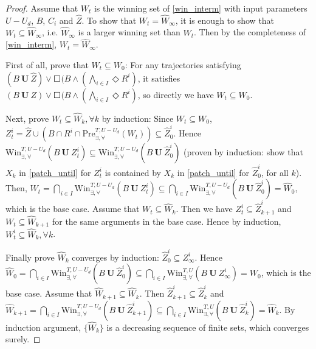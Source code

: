 \begin{proof}
	Assume that $ W_t $ is the winning set of \eqref{win_interm} with input parameters $ U-U_d $, $ B $, $ C_i $ and $ \widehat{Z} $. To show that $ W_t=\widehat{W}_\infty $, it is enough to show that $ W_t\subseteq \widehat{W}_\infty $, i.e. $ \widehat{W}_\infty $ is a larger winning set than $ W_t $. Then by the completeness of \eqref{win_interm}, $ W_t=\widehat{W}_\infty $. 
	
	First of all, prove that $ W_t \subseteq W_0 $: For any trajectories satisfying $ (B\mathbf{\ U\ }\widehat{Z})\vee \Square(B\wedge (\bigwedge_{i\in I} \Diamond R^i) $, it satisfies $  (B\mathbf{\ U\ }Z)\vee \Square(B\wedge (\bigwedge_{i\in I} \Diamond R^i) $, so directly we have $ W_t\subseteq W_0 $. 
	
	Next, prove $ W_t\subseteq \widehat{W}_k, \forall k $ by induction: Since $ W_t\subseteq W_0 $, $ Z_t^i =\widehat{Z}\cup (B\cap R^i\cap \text{Pre}_{\exists,\forall}^{T,U-U_d}(W_t)) \subseteq \widehat{Z}_0^i$. Hence $ \text{Win}_{\exists,\forall}^{T,U-U_d}(B\mathbf{\ U\ }Z_t^i)\subseteq  \text{Win}_{\exists,\forall}^{T,U-U_d}(B\mathbf{\ U\ }\widehat{Z}_0^i) $ (proven by induction: show that $ X_k $ in \eqref{patch_until} for $ Z_t^i $ is contained by $ X_k $ in \eqref{patch_until} for $ \widehat{Z}_0^i $, for all $ k $). Then, $ W_t = \bigcap_{i\in I} \text{Win}_{\exists,\forall}^{T,U-U_d} (B\mathbf{\ U\ } Z_{t}^i)\subseteq  \bigcap_{i\in I} \text{Win}_{\exists,\forall}^{T,U-U_d}(B\mathbf{\ U\ }\widehat{Z}_0^i)  = \widehat{W}_0$, which is the base case. Assume that $ W_t\subseteq \widehat{W}_k $. Then we have $ Z_t^i \subseteq \widehat{Z}_{k+1}^i $ and $ W_t\subseteq \widehat{W}_{k+1} $ for the same arguments in the base case. Hence by induction, $ W_t^i \subseteq \widehat{W}_{k}, \forall k $. 
	
	Finally prove $ \widehat{W}_{k} $ converges by induction: $ \widehat{Z}_0^i \subseteq Z_{\infty}^i $. Hence $ \widehat{W}_0 =\bigcap_{i\in I} \text{Win}_{\exists,\forall}^{T,U-U_d}(B\mathbf{\ U\ }\widehat{Z}_0^i)\subseteq \bigcap_{i\in I} \text{Win}_{\exists,\forall}^{T,U}(B\mathbf{\ U\ }Z_{\infty}^i) = W_0 $, which is the base case. Assume that $ \widehat{W}_{k+1} \subseteq \widehat{W}_k $.  Then $ \widehat{Z}_{k+1}^i\subseteq \widehat{Z}_{k}^i  $ and $ \widehat{W}_{k+1} =\bigcap_{i\in I} \text{Win}_{\exists,\forall}^{T,U-U_d}(B\mathbf{\ U\ }\widehat{Z}_{k+1}^i)\subseteq \bigcap_{i\in I} \text{Win}_{\exists,\forall}^{T,U}(B\mathbf{\ U\ }\widehat{Z}_{k}^i) = \widehat{W}_k $. By induction argument, $ \{\widehat{W}_k\} $ is a decreasing sequence of finite sets, which converges surely.
\end{proof}

